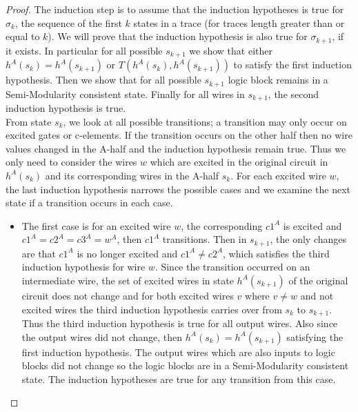 \documentclass[12pt]{report}
\begin{document}
\begin{proof}
The induction step is to assume that the induction hypotheses is true for $\sigma_k$, the sequence of the first $k$ states in a trace (for traces length greater than or equal to $k$).  We will prove that the induction hypothesis is also true for $\sigma_{k+1}$, if it exists.  In particular for all possible $s_{k+1}$ we show that either $h^A(s_{k})=h^A(s_{k+1})$ or $T(h^A(s_{k}),h^A(s_{k+1}))$ to satisfy the first induction hypothesis.  Then we show that for all possible $s_{k+1}$ logic block remains in a Semi-Modularity consistent state.  Finally for all wires in $s_{k+1}$, the second induction hypothesis is true.\\

From state $s_k$, we look at all possible transitions; a transition may only occur on excited gates or c-elements.  If the transition occurs on the other half then no wire values changed in the A-half and the induction hypothesis remain true.  Thus we only need to consider the wires $w$ which are excited in the original circuit in $h^A(s_k)$ and its corresponding wires in the A-half $s_k$.  For each excited wire $w$, the last induction hypothesis narrows the possible cases and we examine the next state if a transition occurs in each case. %
\begin{itemize}
\item The first case is for an excited wire $w$, the corresponding $c1^A$ is excited and $c1^A=c2^A=c3^A=w^A$, then $c1^A$ transitions.  Then in $s_{k+1}$, the only changes are that $c1^A$ is no longer excited and $c1^A\neq c2^A$, which satisfies the third induction hypothesis for wire $w$.  Since the transition occurred on an intermediate wire, the set of excited wires in state $h^A(s_{k+1})$ of the original circuit does not change and for both excited wires $v$ where $v\neq w$ and not excited wires the third induction hypothesis carries over from $s_k$ to $s_{k+1}$.  Thus the third induction hypothesis is true for all output wires.  Also since the output wires did not change, then $h^A(s_k)=h^A(s_{k+1})$ satisfying the first induction hypothesis.  The output wires which are also inputs to logic blocks did not change so the logic blocks are in a Semi-Modularity consistent state.   The induction hypotheses are true for any transition from this case.  %

\end{itemize}
\end{proof}
\end{document}
